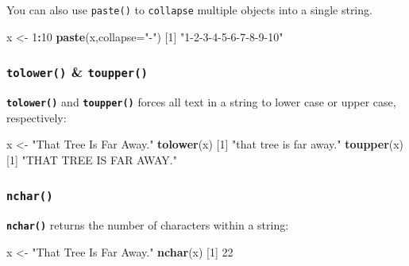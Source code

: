 \documentclass[]{book}
\newenvironment{Shaded}{\begin{snugshade}}{\end{snugshade}}
\newcommand{\DataTypeTok}[1]{\textcolor[rgb]{0.13,0.29,0.53}{#1}}
\newcommand{\DecValTok}[1]{\textcolor[rgb]{0.00,0.00,0.81}{#1}}
\newcommand{\KeywordTok}[1]{\textcolor[rgb]{0.13,0.29,0.53}{\textbf{#1}}}
\newcommand{\NormalTok}[1]{#1}
\newcommand{\OperatorTok}[1]{\textcolor[rgb]{0.81,0.36,0.00}{\textbf{#1}}}
\newcommand{\StringTok}[1]{\textcolor[rgb]{0.31,0.60,0.02}{#1}}
\begin{document}
You can also use \texttt{paste()} to \texttt{collapse} multiple objects into a single string.

\begin{Shaded}
\begin{Highlighting}[]
\NormalTok{x <-}\StringTok{ }\DecValTok{1}\OperatorTok{:}\DecValTok{10}
\KeywordTok{paste}\NormalTok{(x,}\DataTypeTok{collapse=}\StringTok{"-"}\NormalTok{)}
\NormalTok{[}\DecValTok{1}\NormalTok{] }\StringTok{"1-2-3-4-5-6-7-8-9-10"}
\end{Highlighting}
\end{Shaded}

\hypertarget{tolower-toupper}{%
\subsubsection*{\texorpdfstring{\texttt{tolower()} \& \texttt{toupper()}}{tolower() \& toupper()}}\label{tolower-toupper}}

\textbf{\texttt{tolower()}} and \textbf{\texttt{toupper()}} forces all text in a string to lower case or upper case, respectively:

\begin{Shaded}
\begin{Highlighting}[]
\NormalTok{x <-}\StringTok{ "That Tree Is Far Away."}
\KeywordTok{tolower}\NormalTok{(x)}
\NormalTok{[}\DecValTok{1}\NormalTok{] }\StringTok{"that tree is far away."}
\KeywordTok{toupper}\NormalTok{(x)}
\NormalTok{[}\DecValTok{1}\NormalTok{] }\StringTok{"THAT TREE IS FAR AWAY."}
\end{Highlighting}
\end{Shaded}

\hypertarget{nchar}{%
\subsubsection*{\texorpdfstring{\texttt{nchar()}}{nchar()}}\label{nchar}}

\textbf{\texttt{nchar()}} returns the number of characters within a string:

\begin{Shaded}
\begin{Highlighting}[]
\NormalTok{x <-}\StringTok{ "That Tree Is Far Away."}
\KeywordTok{nchar}\NormalTok{(x)}
\NormalTok{[}\DecValTok{1}\NormalTok{] }\DecValTok{22}
\end{Highlighting}
\end{Shaded}
\end{document}
